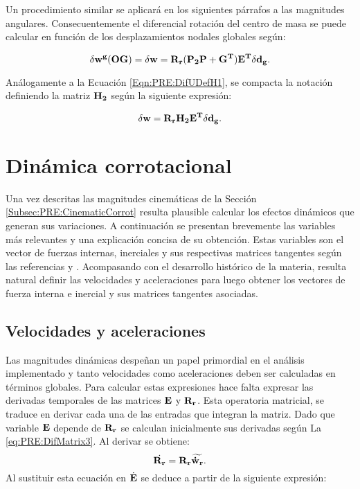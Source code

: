  Un procedimiento similar se aplicará en los siguientes párrafos a las magnitudes angulares. Consecuentemente el diferencial rotación del centro de masa se puede calcular en función de los desplazamientos nodales globales según:

 \begin{equation}\label{Eqn:PRE:AngularBaricentro}
 	\delta \bf{w^g} (OG) =\delta \bf{w} =\bf{R}_r (\bf{P}_2\bf{P}+\bf{G}^T)\bf{E}^T\delta \bf{d}_g .
 \end{equation}

Análogamente a la Ecuación \eqref{Eqn:PRE:DifUDefH1}, se compacta la notación definiendo la matriz $\bf{H}_2$ según la siguiente expresión:

\begin{equation}
	\delta \bf{w}= \bf{R}_r\bf{H}_2\bf{E}^T \delta \bf{d}_g.
\end{equation}




\section{Dinámica corrotacional}\label{Subsec:PRE:DinamicCorrot}

Una vez descritas las magnitudes cinemáticas de la Sección \ref{Subsec:PRE:CinematicCorrot} resulta plausible calcular los efectos dinámicos que generan sus variaciones. A continuación se presentan brevemente las variables más relevantes y una explicación concisa de su obtención. Estas
variables son el vector de fuerzas internas, inerciales y sus respectivas matrices tangentes según las referencias  \citep{Le2014} y \citep{Battini2002}. Acompasando con el desarrollo histórico de la materia, resulta natural definir las velocidades y aceleraciones para luego obtener los vectores de fuerza interna e inercial y sus matrices tangentes asociadas. 

\subsection{Velocidades y aceleraciones}\label{Sec:PRE:VelAc}

Las magnitudes dinámicas despeñan un papel primordial en el análisis implementado y tanto velocidades como aceleraciones deben ser calculadas en términos globales. Para calcular estas expresiones hace falta expresar las derivadas temporales de las matrices $\bf{E}$ y $\bf{R}_r$. Esta operatoria matricial, se traduce en derivar cada una de las entradas que integran la matriz. Dado que variable $\bf{E}$ depende de $\bf{R}_r$ se calculan inicialmente sus derivadas según La \eqref{eq:PRE:DifMatrix3}. Al derivar se obtiene: 
\begin{equation}
\dot{\bf{R}_r} = \bf{R_r}\widetilde{\dot{\bf{w}}_r}.
\end{equation}
 Al sustituir esta ecuación en $\dot{\bf{E}}$ se deduce a partir de la siguiente expresión:

